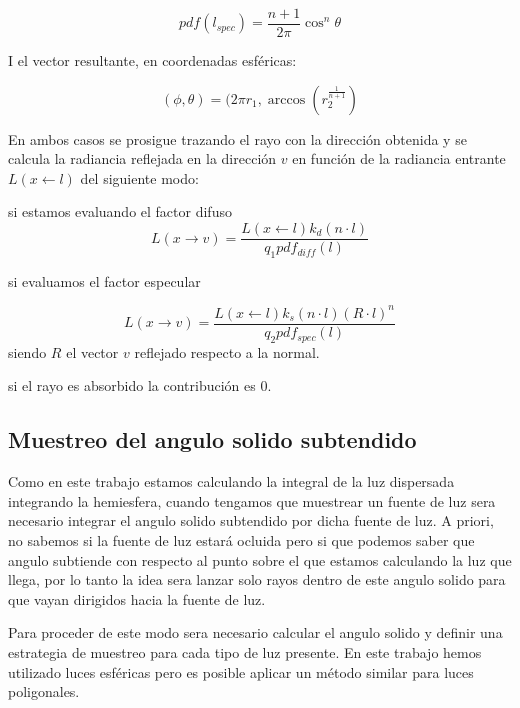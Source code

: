 \begin{equation}
pdf(l_{spec}) = \frac{n + 1}{2\pi}\cos^n\theta
\end{equation}

I el vector resultante, en coordenadas esféricas:

\begin{equation}
(\phi, \theta) = (2\pi r_1, \arccos(r_2^{\frac{1}{n+1}}) 
\end{equation}

En ambos casos se prosigue trazando el rayo con la dirección obtenida y se calcula la radiancia reflejada en la dirección $v$ en función de la radiancia entrante $L(x \gets l)$ del siguiente modo:
\medskip

si estamos evaluando el factor difuso
\begin{equation}
L(x \to v) = \frac{L(x \gets l)k_d(n \cdot l)}{q_1 pdf_{diff}(l)}
\end{equation}

si evaluamos el factor especular

\begin{equation}
L(x \to v) = \frac{L(x \gets l)k_s(n \cdot l)(R \cdot l)^n}{q_2 pdf_{spec}(l)}
\end{equation}
siendo $R$ el vector $v$ reflejado respecto a la normal.

si el rayo es absorbido la contribución es $0$.




\clearpage

\subsection{Muestreo del angulo solido subtendido}
\label{sample_solid}

Como en este trabajo estamos calculando la integral de la luz dispersada integrando la hemiesfera, cuando tengamos que muestrear un fuente de luz sera necesario integrar el angulo solido subtendido por dicha fuente de luz. A priori, no sabemos si la fuente de luz estará ocluida pero si que podemos saber que angulo subtiende con respecto al punto sobre el que estamos calculando la luz que llega, por lo tanto la idea sera lanzar solo rayos dentro de este angulo solido para que vayan dirigidos hacia la fuente de luz.

\medskip

Para proceder de este modo sera necesario calcular el angulo solido y definir una estrategia de muestreo para cada tipo de luz presente. En este trabajo hemos utilizado luces esféricas pero es posible aplicar un método similar para luces poligonales.


